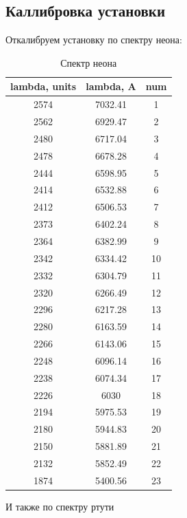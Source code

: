\documentclass{article}
\begin{document}
\subsection{Каллибровка установки}
Откалибруем установку по спектру неона:
\begin{table}[H]
	\centering
\begin{tabular}{|c|c|c|}
	\hline
lambda, units & lambda, A & num \\\hline
2574          & 7032.41   & 1   \\\hline
2562          & 6929.47   & 2   \\\hline
2480          & 6717.04   & 3   \\\hline
2478          & 6678.28   & 4   \\\hline
2444          & 6598.95   & 5   \\\hline
2414          & 6532.88   & 6   \\\hline
2412          & 6506.53   & 7   \\\hline
2373          & 6402.24   & 8   \\\hline
2364          & 6382.99   & 9   \\\hline
2342          & 6334.42   & 10  \\\hline
2332          & 6304.79   & 11  \\\hline
2320          & 6266.49   & 12  \\\hline
2296          & 6217.28   & 13  \\\hline
2280          & 6163.59   & 14  \\\hline
2266          & 6143.06   & 15  \\\hline
2248          & 6096.14   & 16  \\\hline
2238          & 6074.34   & 17  \\\hline
2226          & 6030      & 18  \\\hline
2194          & 5975.53   & 19  \\\hline
2180          & 5944.83   & 20  \\\hline
2150          & 5881.89   & 21  \\\hline
2132          & 5852.49   & 22  \\\hline
1874          & 5400.56   & 23  \\\hline
\end{tabular}
	\caption{Спектр неона}
\end{table}

И также по спектру ртути
\end{document}
